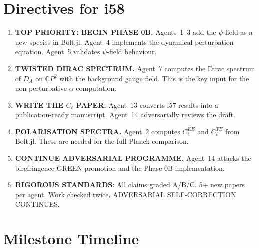 \documentclass[11pt,a4paper]{article}
\newcommand{\CP}{\mathbb{C}P}
\begin{document}
\section{Directives for i58}
\label{sec:directives}

\begin{enumerate}
\item \textbf{TOP PRIORITY: BEGIN PHASE 0B.} Agents~1--3 add the $\psi$-field as a new species in Bolt.jl. Agent~4 implements the dynamical perturbation equation. Agent~5 validates $\psi$-field behaviour.
\item \textbf{TWISTED DIRAC SPECTRUM.} Agent~7 computes the Dirac spectrum of $D_A$ on $\CP^2$ with the background gauge field. This is the key input for the non-perturbative $\alpha$ computation.
\item \textbf{WRITE THE $C_\ell$ PAPER.} Agent~13 converts i57 results into a publication-ready manuscript. Agent~14 adversarially reviews the draft.
\item \textbf{POLARISATION SPECTRA.} Agent~2 computes $C_\ell^{EE}$ and $C_\ell^{TE}$ from Bolt.jl. These are needed for the full Planck comparison.
\item \textbf{CONTINUE ADVERSARIAL PROGRAMME.} Agent~14 attacks the birefringence GREEN promotion and the Phase 0B implementation.
\item \textbf{RIGOROUS STANDARDS}: All claims graded A/B/C. 5+ new papers per agent. Work checked twice. ADVERSARIAL SELF-CORRECTION CONTINUES.
\end{enumerate}


\section{Milestone Timeline}
\label{sec:timeline}
\end{document}
